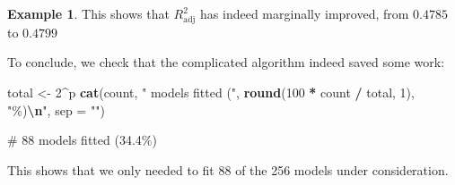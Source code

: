 \documentclass[
  a4paper,
]{article}
\newenvironment{Shaded}{\begin{snugshade}}{\end{snugshade}}
\newcommand{\AttributeTok}[1]{\textcolor[rgb]{0.13,0.29,0.53}{#1}}
\newcommand{\DecValTok}[1]{\textcolor[rgb]{0.00,0.00,0.81}{#1}}
\newcommand{\FunctionTok}[1]{\textcolor[rgb]{0.13,0.29,0.53}{\textbf{#1}}}
\newcommand{\NormalTok}[1]{#1}
\newcommand{\OtherTok}[1]{\textcolor[rgb]{0.56,0.35,0.01}{#1}}
\newcommand{\SpecialCharTok}[1]{\textcolor[rgb]{0.81,0.36,0.00}{\textbf{#1}}}
\newcommand{\StringTok}[1]{\textcolor[rgb]{0.31,0.60,0.02}{#1}}
\theoremstyle{definition}
\theoremstyle{definition}
\newtheorem{example}{Example}[section]
\theoremstyle{definition}
\theoremstyle{definition}
\theoremstyle{remark}
\begin{document}
\begin{example}
This shows that \(R^2_\mathrm{adj}\) has indeed marginally improved,
from \(0.4785\) to \(0.4799\)

To conclude, we check that the complicated algorithm indeed saved some work:

\begin{Shaded}
\begin{Highlighting}[]
\NormalTok{total }\OtherTok{\textless{}{-}} \DecValTok{2}\SpecialCharTok{\^{}}\NormalTok{p}
\FunctionTok{cat}\NormalTok{(count,}
    \StringTok{" models fitted ("}\NormalTok{, }\FunctionTok{round}\NormalTok{(}\DecValTok{100} \SpecialCharTok{*}\NormalTok{ count }\SpecialCharTok{/}\NormalTok{ total, }\DecValTok{1}\NormalTok{), }\StringTok{"\%)}\SpecialCharTok{\textbackslash{}n}\StringTok{"}\NormalTok{,}
    \AttributeTok{sep =} \StringTok{""}\NormalTok{)}
\end{Highlighting}
\end{Shaded}

\begin{Shaded}
\begin{Highlighting}[]
\NormalTok{\# 88 models fitted (34.4\%)}
\end{Highlighting}
\end{Shaded}

This shows that we only needed to fit 88 of the 256 models under consideration.
\end{example}
\end{document}
